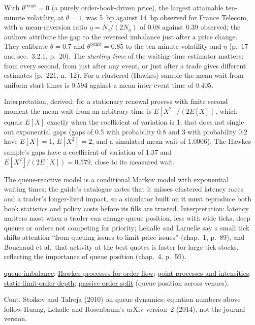 \begin{qfmodel}
With $\theta^{\text{reinit}}=0$ (a purely order-book-driven price), the largest attainable ten-minute volatility, at $\theta=1$, was 5~bp against 14~bp observed for France Telecom, with a mean-reversion ratio $\eta=N_c/(2N_a)$ of 0.08 against 0.39 observed; the authors attribute the gap to the reversed imbalance just after a price change. They calibrate $\theta=0.7$ and $\theta^{\text{reinit}}=0.85$ to the ten-minute volatility and $\eta$ (p.~17 and sec.~3.2.1, p.~20). The \emph{starting time} of the waiting-time estimator matters: from every second, from just after any event, or just after a trade gives different estimates (p.~221, n.~12). For a clustered (Hawkes) sample the mean wait from uniform start times is 0.594 against a mean inter-event time of 0.405.

Interpretation, derived: for a stationary renewal process with finite second moment the mean wait from an arbitrary time is $E[X^2]/(2E[X])$, which equals $E[X]$ exactly when the coefficient of variation is 1; that does not single out exponential gaps (gaps of 0.5 with probability 0.8 and 3 with probability 0.2 have $E[X]=1$, $E[X^2]=2$, and a simulated mean wait of 1.0006). The Hawkes sample's gaps have a coefficient of variation of 1.37 and $E[X^2]/(2E[X])=0.579$, close to its measured wait.

 The queue-reactive model is a conditional Markov model with exponential waiting times; the guide's catalogue notes that it misses clustered latency races and a trader's longer-lived impact, so a simulator built on it must reproduce both book statistics and policy costs before its fills are trusted. Interpretation: latency matters most when a trader can change queue position, less with wide ticks, deep queues or orders not competing for priority; Lehalle and Laruelle say a small tick shifts attention ``from queuing issues to limit price issues'' (chap.~1, p.~89), and Bouchaud et al.\ that activity at the best quotes is faster for large-tick stocks, reflecting the importance of queue position (chap.~4, p.~59).

 \hyperref[def:queue-imbalance]{queue imbalance}; \hyperref[mod:hawkes-order-flow]{Hawkes processes for order flow}; \hyperref[def:order-event-point-processes]{point processes and intensities}; \hyperref[mod:static-limit-order-depth]{static limit-order depth}; \hyperref[meth:passive-order-split]{passive order split} (queue position across venues).

 Cont, Stoikov and Talreja (2010) on queue dynamics; equation numbers above follow Huang, Lehalle and Rosenbaum's arXiv version~2 (2014), not the journal version.

\end{qfmodel}
